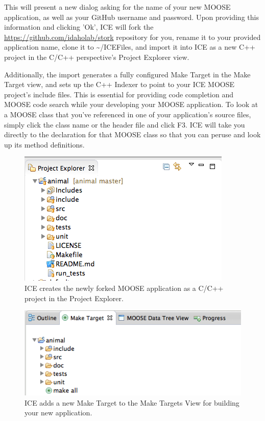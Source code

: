 This will present a new dialog asking for the name of your new MOOSE
application, as well as your GitHub username and password. Upon
providing this information and clicking 'Ok', ICE will fork the
\url{https://github.com/idaholab/stork} repository for you, rename it to
your provided application name, clone it to \textasciitilde{}/ICEFiles,
and import it into ICE as a new C++ project in the C/C++ perspective's
Project Explorer view.

Additionally, the import generates a fully configured Make Target in the
Make Target view, and sets up the C++ Indexer to point to your ICE MOOSE
project's include files. This is essential for providing code completion
and MOOSE code search while your developing your MOOSE application. To
look at a MOOSE class that you've referenced in one of your
application's source files, simply click the class name or the header
file and click F3. ICE will take you directly to the declaration for
that MOOSE class so that you can peruse and look up its method
definitions.

\begin{figure}[htbp]
\centering
\includegraphics[width=\textwidth]{figures/New_app.png}
\caption{ICE creates the newly forked MOOSE application as a C/C++ project in the Project Explorer.}
\end{figure}
\begin{figure}[htbp]
\centering
\includegraphics[width=\textwidth]{figures/Make_target.png}
\caption{ICE adds a new Make Target to the Make Targets View for building your new application.}
\end{figure}

